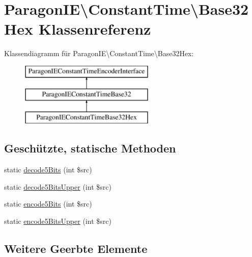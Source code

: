 \hypertarget{class_paragon_i_e_1_1_constant_time_1_1_base32_hex}{}\section{Paragon\+IE\textbackslash{}Constant\+Time\textbackslash{}Base32\+Hex Klassenreferenz}
\label{class_paragon_i_e_1_1_constant_time_1_1_base32_hex}
Klassendiagramm für Paragon\+IE\textbackslash{}Constant\+Time\textbackslash{}Base32\+Hex\+:\begin{figure}[H]
\begin{center}
\leavevmode
\includegraphics[height=3.000000cm]{class_paragon_i_e_1_1_constant_time_1_1_base32_hex}
\end{center}
\end{figure}
\subsection*{Geschützte, statische Methoden}
\begin{DoxyCompactItemize}
\item 
static \mbox{\hyperlink{class_paragon_i_e_1_1_constant_time_1_1_base32_hex_a93438299813656c7801078a9623bbbc3}{decode5\+Bits}} (int \$src)
\item 
static \mbox{\hyperlink{class_paragon_i_e_1_1_constant_time_1_1_base32_hex_a19c649bfe1c47151e2946100208d85b1}{decode5\+Bits\+Upper}} (int \$src)
\item 
static \mbox{\hyperlink{class_paragon_i_e_1_1_constant_time_1_1_base32_hex_a9b8e75156f677fa5f071f67d788de0a7}{encode5\+Bits}} (int \$src)
\item 
static \mbox{\hyperlink{class_paragon_i_e_1_1_constant_time_1_1_base32_hex_a2672daaf226ae7324e38d0faa7058f3c}{encode5\+Bits\+Upper}} (int \$src)
\end{DoxyCompactItemize}
\subsection*{Weitere Geerbte Elemente}


